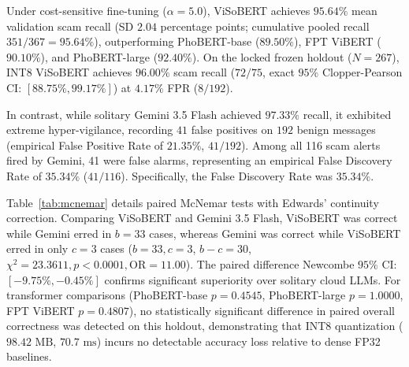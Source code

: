 \documentclass[journal]{IEEEtran}
\begin{document}
Under cost-sensitive fine-tuning ($\alpha=5.0$), ViSoBERT achieves $95.64\%$ mean validation scam recall (SD $2.04$ percentage points; cumulative pooled recall $351/367 = 95.64\%$), outperforming PhoBERT-base ($89.50\%$), FPT ViBERT ($90.10\%$), and PhoBERT-large ($92.40\%$). On the locked frozen holdout ($N=267$), INT8 ViSoBERT achieves $96.00\%$ scam recall ($72/75$, exact $95\%$ Clopper-Pearson CI: $[88.75\%, 99.17\%]$) at $4.17\%$ FPR ($8/192$).

In contrast, while solitary Gemini 3.5 Flash achieved $97.33\%$ recall, it exhibited extreme hyper-vigilance, recording $41$ false positives on $192$ benign messages (empirical False Positive Rate of $21.35\%$, $41/192$). Among all 116 scam alerts fired by Gemini, 41 were false alarms, representing an empirical False Discovery Rate of $35.34\%$ ($41/116$). Specifically, the False Discovery Rate was $35.34\%$.

\begin{table}[h]
\centering
\caption{Paired McNemar Test Analysis across Model Configurations ($\alpha=0.05$)}
\label{tab:mcnemar}
\renewcommand{\arraystretch}{0.92}
\end{table}

Table~\ref{tab:mcnemar} details paired McNemar tests with Edwards' continuity correction. Comparing ViSoBERT and Gemini 3.5 Flash, ViSoBERT was correct while Gemini erred in $b = 33$ cases, whereas Gemini was correct while ViSoBERT erred in only $c = 3$ cases ($b=33, c=3$, $b - c = 30$, $\chi^2 = 23.3611, p < 0.0001, \text{OR} = 11.00$). The paired difference Newcombe $95\%$ CI: $[-9.75\%, -0.45\%]$ confirms significant superiority over solitary cloud LLMs. For transformer comparisons (PhoBERT-base $p=0.4545$, PhoBERT-large $p=1.0000$, FPT ViBERT $p=0.4807$), no statistically significant difference in paired overall correctness was detected on this holdout, demonstrating that INT8 quantization ($98.42\text{ MB}$, $70.7\text{ ms}$) incurs no detectable accuracy loss relative to dense FP32 baselines.
\end{document}
